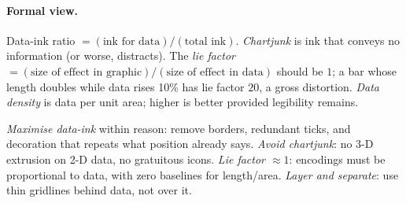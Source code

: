 \paragraph{Formal view.} Data-ink ratio $= (\text{ink for data}) / (\text{total ink})$. \emph{Chartjunk} is ink that conveys no information (or worse, distracts). The \emph{lie factor} $= (\text{size of effect in graphic}) / (\text{size of effect in data})$ should be $1$; a bar whose length doubles while data rises 10\% has lie factor $20$, a gross distortion. \emph{Data density} is data per unit area; higher is better provided legibility remains.

\begin{definition}\label{def:tufte}
\emph{Maximise data-ink} within reason: remove borders, redundant ticks, and decoration that repeats what position already says. \emph{Avoid chartjunk}: no 3-D extrusion on 2-D data, no gratuitous icons. \emph{Lie factor $\approx1$}: encodings must be proportional to data, with zero baselines for length/area. \emph{Layer and separate}: use thin gridlines behind data, not over it.
\end{definition}

